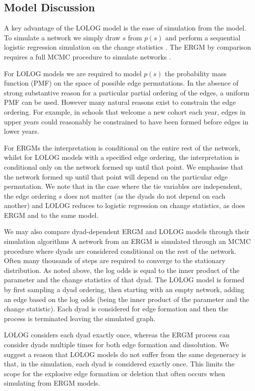 \documentclass[
]{statsoc}
\begin{document}
\subsection{Model Discussion}\label{sec:comparison}

A key advantage of the LOLOG model is the ease of simulation from the
model. To simulate a network we simply draw \(s\) from \(p(s)\) and
perform a sequential logistic regression simulation on the change
statistics \citep{LOLOG_github}. The ERGM by comparison requires a full
MCMC procedure to simulate networks \citep{ergm_3_9_4}.

For LOLOG models we are required to model \(p(s)\) the probability mass
function (PMF) on the space of possible edge permutations. In the
absence of strong substantive reason for a particular partial ordering
of the edges, a uniform PMF can be used. However many natural reasons
exist to constrain the edge ordering. For example, in schools that
welcome a new cohort each year, edges in upper years could reasonably be
constrained to have been formed before edges in lower years.

For ERGMs the interpretation is conditional on the entire rest of the
network, whilst for LOLOG models with a specified edge ordering, the
interpretation is conditional only on the network formed up until that
point. We emphasise that the network formed up until that point will
depend on the particular edge permutation. We note that in the case
where the tie variables are independent, the edge ordering \(s\) does
not matter (as the dyads do not depend on each another) and LOLOG
reduces to logistic regression on change statistics, as does ERGM and to
the same model.

We may also compare dyad-dependent ERGM and LOLOG models through their
simulation algorithms A network from an ERGM is simulated through an
MCMC procedure where dyads are considered conditional on the rest of the
network. Often many thousands of steps are required to converge to the
stationary distribution. As noted above, the log odds is equal to the
inner product of the parameter and the change statistics of that dyad.
The LOLOG model is formed by first sampling a dyad ordering, then
starting with an empty network, adding an edge based on the log odds
(being the inner product of the parameter and the change statistic).
Each dyad is considered for edge formation and then the process is
terminated leaving the simulated graph.

LOLOG considers each dyad exactly once, whereas the ERGM process can
consider dyads multiple times for both edge formation and dissolution.
We suggest a reason that LOLOG models do not suffer from the same
degeneracy is that, in the simulation, each dyad is considered exactly
once. This limits the scope for the explosive edge formation or deletion
that often occurs when simulating from ERGM models.
\end{document}
